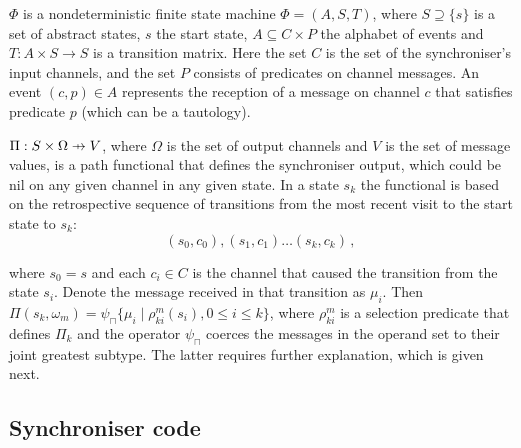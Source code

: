 \documentclass[11pt]{report}
\begin{document}
$\Phi$ is a nondeterministic finite state machine $\Phi=(A,S,T)$, where $S\supseteq \{s\}$ is a set of abstract states, $s$ the start state, $A\subseteq C\times P$ the alphabet of events and $T:A\times S\to S$ is a transition matrix. Here the set $C$ is the set of the synchroniser's input channels, and the set $P$ consists of predicates on channel messages. An event $(c,p)\in A$ represents the reception of a message on channel $c$ that satisfies predicate $p$ (which can be a tautology).

\newcommand\pfun{\mathrel{\ooalign{\hfil$\mapstochar\mkern5mu$\hfil\cr$\to$\cr}}}

$\Pi: S\times\Omega\pfun V $, where $\Omega$ is the set of output channels and $V$ is the set of message values, is a path functional that defines the synchroniser output, which could be nil on any given channel in any given state. In a state $s_k$ the functional is based on the retrospective sequence of transitions from the most recent visit to the start state to $s_k$:
\[
(s_0,c_0),(s_1,c_1)\ldots (s_k,c_k)\,,
\]

where $s_0=s$ and each $c_i\in C$ is the channel that caused the transition from the state $s_i$. Denote the message received in that transition
as $\mu_i$. Then $\Pi (s_k,\omega_m) = \psi_{\sqcap} \{\mu_i \mid \rho_{ki}^m (s_i), 0\le i\le k\}$, where $\rho_{ki}^m$ is a selection predicate that defines $\Pi_k$ and the operator $\psi_{\sqcap}$ coerces the messages in the operand set to their joint greatest subtype.  The latter requires further explanation, which is given next.



\subsection{Synchroniser code\label{sec:sync}}
\end{document}
